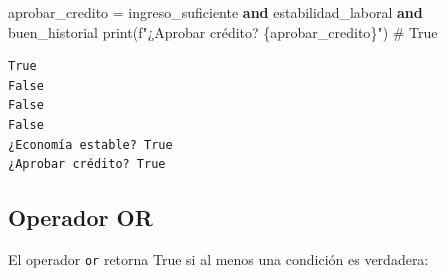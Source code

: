 \documentclass[
  doc,
  floatsintext,
  longtable,
  a4paper,
  nolmodern,
  notxfonts,
  notimes,
  12pt,
  colorlinks=true,linkcolor=blue,citecolor=blue,urlcolor=blue]{apa7}
\newenvironment{Shaded}{\begin{snugshade}}{\end{snugshade}}
\newcommand{\BuiltInTok}[1]{\textcolor[rgb]{0.00,0.23,0.31}{#1}}
\newcommand{\CommentTok}[1]{\textcolor[rgb]{0.37,0.37,0.37}{#1}}
\newcommand{\KeywordTok}[1]{\textcolor[rgb]{0.00,0.23,0.31}{\textbf{#1}}}
\newcommand{\NormalTok}[1]{\textcolor[rgb]{0.00,0.23,0.31}{#1}}
\newcommand{\OperatorTok}[1]{\textcolor[rgb]{0.37,0.37,0.37}{#1}}
\newcommand{\SpecialCharTok}[1]{\textcolor[rgb]{0.37,0.37,0.37}{#1}}
\newcommand{\SpecialStringTok}[1]{\textcolor[rgb]{0.13,0.47,0.30}{#1}}
\begin{document}
\begin{Shaded}
\begin{Highlighting}[]
\NormalTok{aprobar\_credito }\OperatorTok{=}\NormalTok{ ingreso\_suficiente }\KeywordTok{and}\NormalTok{ estabilidad\_laboral }\KeywordTok{and}\NormalTok{ buen\_historial}
\BuiltInTok{print}\NormalTok{(}\SpecialStringTok{f"¿Aprobar crédito? }\SpecialCharTok{\{}\NormalTok{aprobar\_credito}\SpecialCharTok{\}}\SpecialStringTok{"}\NormalTok{)  }\CommentTok{\# True}
\end{Highlighting}
\end{Shaded}

\begin{verbatim}
True
False
False
False
¿Economía estable? True
¿Aprobar crédito? True
\end{verbatim}

\subsection{Operador OR}\label{operador-or}

El operador \texttt{or} retorna True si al menos una condición es
verdadera:
\end{document}
